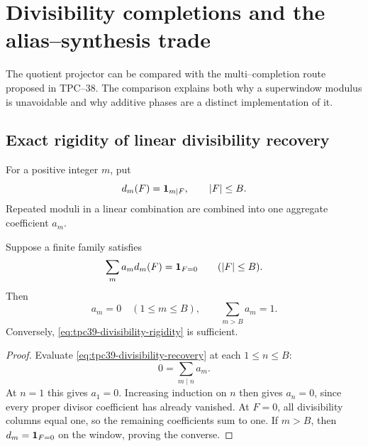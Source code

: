 \section{Divisibility completions and the alias--synthesis trade}
\label{sec:tpc39-completion-comparison}

The quotient projector can be compared with the multi--completion route
proposed in TPC--38.  The comparison explains both why a superwindow
modulus is unavoidable and why additive phases are a distinct
implementation of it.

\subsection{Exact rigidity of linear divisibility recovery}

For a positive integer \(m\), put
\begin{equation}
 d_m(F)=\mathbf 1_{m\mid F},
 \qquad |F|\le B.
 \label{eq:tpc39-divisibility-column}
\end{equation}
Repeated moduli in a linear combination are combined into one aggregate
coefficient \(a_m\).

\begin{theorem}
\label{thm:tpc39-divisibility-rigidity}
Suppose a finite family satisfies
\begin{equation}
 \sum_m a_m d_m(F)=\mathbf 1_{F=0}
 \qquad(|F|\le B).
 \label{eq:tpc39-divisibility-recovery}
\end{equation}
Then
\begin{equation}
 a_m=0\quad(1\le m\le B),
 \qquad
 \sum_{m>B}a_m=1.
 \label{eq:tpc39-divisibility-rigidity}
\end{equation}
Conversely, \eqref{eq:tpc39-divisibility-rigidity} is sufficient.
\end{theorem}

\begin{proof}
Evaluate \eqref{eq:tpc39-divisibility-recovery} at each
\(1\le n\le B\):
\begin{equation}
 0=\sum_{m\mid n}a_m.
 \label{eq:tpc39-divisibility-triangular}
\end{equation}
At \(n=1\) this gives \(a_1=0\).  Increasing induction on \(n\) then
gives \(a_n=0\), since every proper divisor coefficient has already
vanished.  At \(F=0\), all divisibility columns equal one, so the remaining
coefficients sum to one.  If \(m>B\), then \(d_m=\mathbf 1_{F=0}\) on the
window, proving the converse.
\end{proof}

